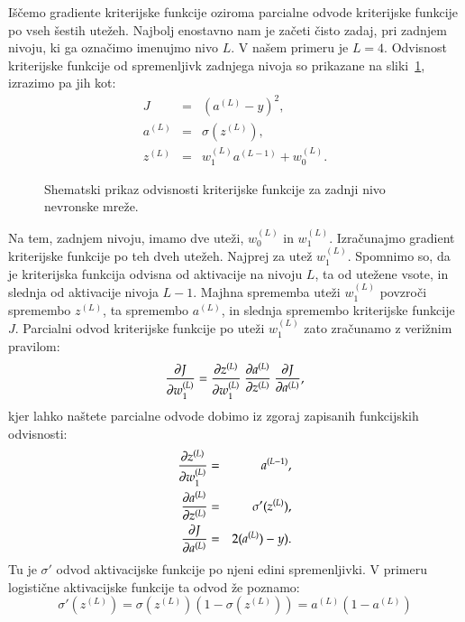 Iščemo gradiente kriterijske funkcije oziroma parcialne odvode kriterijske funkcije po vseh šestih utežeh. Najbolj enostavno nam je začeti čisto zadaj, pri zadnjem nivoju, ki ga označimo imenujmo nivo $L$. V našem primeru je $L=4$. Odvisnost kriterijske funkcije od spremenljivk zadnjega nivoja so prikazane na sliki~\ref{f-nn-zadnji}, izrazimo pa jih kot:
\begin{eqnarray}
J & = & (a^{(L)}-y)^2, \\
a^{(L)} & = & \sigma(z^{(L)}), \\
z^{(L)} & = & w_1^{(L)} a^{(L-1)} + w_0^{(L)}.
\end{eqnarray}

\begin{figure}
\caption{Shematski prikaz odvisnosti kriterijske funkcije za zadnji nivo nevronske mreže.}
\label{f-nn-zadnji}
\end{figure}

Na tem, zadnjem nivoju, imamo dve uteži, $w_0^{(L)}$ in $w_1^{(L)}$. Izračunajmo gradient kriterijske funkcije po teh dveh utežeh. Najprej za utež $w_1^{(L)}$. Spomnimo so, da je kriterijska funkcija odvisna od aktivacije na nivoju $L$, ta od utežene vsote, in slednja od aktivacije nivoja $L-1$. Majhna sprememba uteži $w_1^{(L)}$ povzroči spremembo $z^{(L)}$, ta spremembo $a^{(L)}$, in slednja spremembo kriterijske funkcije $J$. Parcialni odvod kriterijske funkcije po uteži $w_1^{(L)}$ zato zračunamo z verižnim pravilom:
\begin{equation}
\pd{J}{w_1^{(L)}} = \pd{z^{(L)}}{w_1^{(L)}}\ \pd{a^{(L)}}{z^{(L)}}\ \pd{J}{a^{(L)}},
\end{equation}
\noindent kjer lahko naštete parcialne odvode dobimo iz zgoraj zapisanih funkcijskih odvisnosti:
\begin{eqnarray}
\frac{\partial z^{(L)}}{\partial w_1^{(L)}} & = & a^{(L-1)}, \\
\frac{\partial a^{(L)}}{\partial z^{(L)}} & = & \sigma'(z^{(L)}), \\
\frac{\partial J}{\partial a^{(L)}} & = & 2(a^{(L)})-y).
\end{eqnarray}
\noindent Tu je $\sigma'$ odvod aktivacijske funkcije po njeni edini spremenljivki. V primeru logistične aktivacijske funkcije ta odvod že poznamo:
\begin{equation}
\sigma'(z^{(L)})=\sigma(z^{(L)})(1-\sigma(z^{(L)}))=a^{(L)}(1-a^{(L)})
\end{equation}

